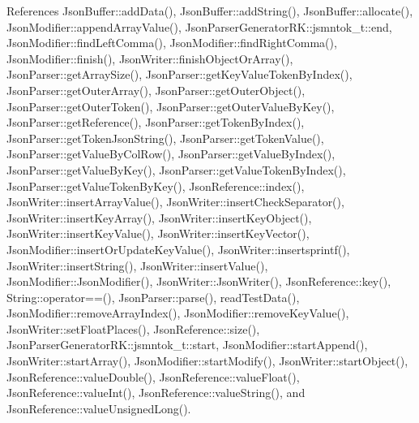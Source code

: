References Json\+Buffer\+::add\+Data(), Json\+Buffer\+::add\+String(), Json\+Buffer\+::allocate(), Json\+Modifier\+::append\+Array\+Value(), Json\+Parser\+Generator\+R\+K\+::jsmntok\+\_\+t\+::end, Json\+Modifier\+::find\+Left\+Comma(), Json\+Modifier\+::find\+Right\+Comma(), Json\+Modifier\+::finish(), Json\+Writer\+::finish\+Object\+Or\+Array(), Json\+Parser\+::get\+Array\+Size(), Json\+Parser\+::get\+Key\+Value\+Token\+By\+Index(), Json\+Parser\+::get\+Outer\+Array(), Json\+Parser\+::get\+Outer\+Object(), Json\+Parser\+::get\+Outer\+Token(), Json\+Parser\+::get\+Outer\+Value\+By\+Key(), Json\+Parser\+::get\+Reference(), Json\+Parser\+::get\+Token\+By\+Index(), Json\+Parser\+::get\+Token\+Json\+String(), Json\+Parser\+::get\+Token\+Value(), Json\+Parser\+::get\+Value\+By\+Col\+Row(), Json\+Parser\+::get\+Value\+By\+Index(), Json\+Parser\+::get\+Value\+By\+Key(), Json\+Parser\+::get\+Value\+Token\+By\+Index(), Json\+Parser\+::get\+Value\+Token\+By\+Key(), Json\+Reference\+::index(), Json\+Writer\+::insert\+Array\+Value(), Json\+Writer\+::insert\+Check\+Separator(), Json\+Writer\+::insert\+Key\+Array(), Json\+Writer\+::insert\+Key\+Object(), Json\+Writer\+::insert\+Key\+Value(), Json\+Writer\+::insert\+Key\+Vector(), Json\+Modifier\+::insert\+Or\+Update\+Key\+Value(), Json\+Writer\+::insertsprintf(), Json\+Writer\+::insert\+String(), Json\+Writer\+::insert\+Value(), Json\+Modifier\+::\+Json\+Modifier(), Json\+Writer\+::\+Json\+Writer(), Json\+Reference\+::key(), String\+::operator==(), Json\+Parser\+::parse(), read\+Test\+Data(), Json\+Modifier\+::remove\+Array\+Index(), Json\+Modifier\+::remove\+Key\+Value(), Json\+Writer\+::set\+Float\+Places(), Json\+Reference\+::size(), Json\+Parser\+Generator\+R\+K\+::jsmntok\+\_\+t\+::start, Json\+Modifier\+::start\+Append(), Json\+Writer\+::start\+Array(), Json\+Modifier\+::start\+Modify(), Json\+Writer\+::start\+Object(), Json\+Reference\+::value\+Double(), Json\+Reference\+::value\+Float(), Json\+Reference\+::value\+Int(), Json\+Reference\+::value\+String(), and Json\+Reference\+::value\+Unsigned\+Long().


